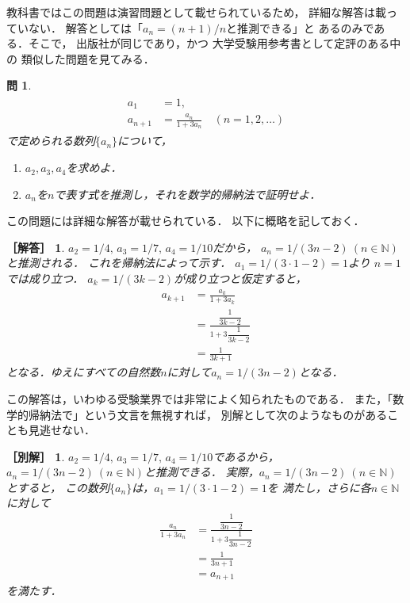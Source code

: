 \documentclass[11pt,a4paper]{ltjsarticle} %
\theoremstyle{mystyle} %
\newtheorem{que}{問} %
\newtheorem*{ans}{［解答］} %
\newtheorem*{ans2}{［別解］} %
\begin{document}
教科書ではこの問題は演習問題として載せられているため，
詳細な解答は載っていない．
解答としては「$a_n=(n+1)/n$と推測できる」と
あるのみである．そこで，
出版社が同じであり，かつ
大学受験用参考書として定評のある\cite{chert}中の
類似した問題を見てみる．
\begin{que} \label{que:suisokuchert}
	\begin{align}
		\begin{aligned}
			a_1     & = 1,                                             \\
			a_{n+1} & = \frac{a_n}{1 + 3 a_n} \quad ( n = 1,2,\ldots )
		\end{aligned}
		\label{eq:zenkasiki}
	\end{align}
	で定められる数列$\{ a_n \}$について，
	\begin{enumerate}
		\item $a_2,a_3,a_4$を求めよ．
		\item $a_n$を$n$で表す式を推測し，それを数学的帰納法で証明せよ．
	\end{enumerate}
\end{que}

この問題には詳細な解答が載せられている．
以下に概略を記しておく．

\begin{ans}
	$a_2=1/4, \, a_3 = 1/7 , \, a_4 = 1/10$だから，
	$a_n = 1/(3n-2) \ (n \in \mathbb{N})$と推測される．
	これを帰納法によって示す．
	$a_1=1/(3 \cdot 1 -2) = 1$より
	$n=1$では成り立つ．
	$a_k= 1/(3k-2)$が成り立つと仮定すると，
	\begin{align*}
		a_{k+1} & = \frac{a_k}{1+3a_k}                                \\
		        & = \frac{ \dfrac{1}{3k-2} }{ 1 + 3 \dfrac{1}{3k-2} } \\
		        & = \frac{1}{3k+1}
	\end{align*}
	となる．ゆえにすべての自然数$n$に対して$a_n=1/(3n-2)$となる．
\end{ans}

この解答は，いわゆる受験業界では非常によく知られたものである．
また，「数学的帰納法で」という文言を無視すれば，
別解として次のようなものがあることも見逃せない．

\begin{ans2}
	$a_2 = 1/4 , \, a_3 = 1/7 , \, a_4 = 1/10$であるから，
	$a_n = 1/(3n-2) \ (n \in \mathbb{N})$と推測できる．
	実際，$a_n = 1/(3n-2) \ (n \in \mathbb{N})$とすると，
	この数列$\{ a_n \}$は，$a_1 = 1/(3 \cdot 1-2)=1$を
	満たし，さらに各$n \in \mathbb{N}$に対して
	\begin{align*}
		\frac{a_n}{1+ 3 a_n} & =
		\frac{ \dfrac{1}{3n-2} }{ 1+ 3 \dfrac{1}{3n-2} } \\
		                     & = \frac{1}{3n+1}          \\
		                     & = a_{n+1}
	\end{align*}
	を満たす．
\end{ans2}
\end{document}
